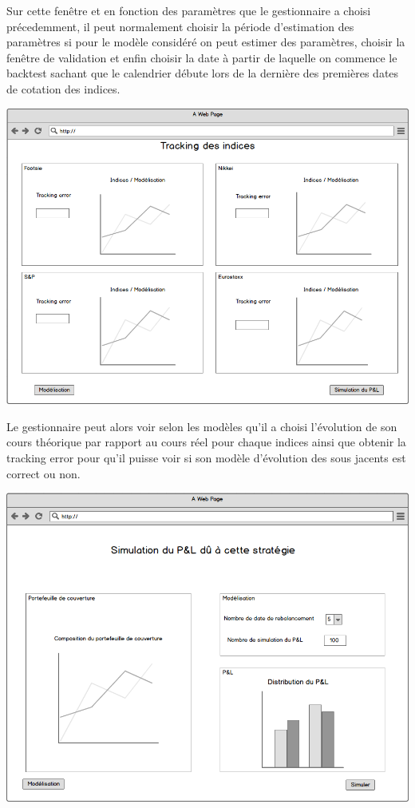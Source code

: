 \documentclass[french,12pt,a4paper]{article}
\begin{document}
 Sur cette fenêtre et en fonction des paramètres que le gestionnaire a choisi précedemment, il peut normalement choisir la période d'estimation des paramètres si pour le modèle considéré on peut estimer des paramètres, choisir la fenêtre de validation et enfin choisir la date à partir de laquelle on commence le backtest sachant que le calendrier débute lors de la dernière des premières dates de cotation des indices.

\begin{center}
\includegraphics[scale=0.4]{../Images/Maquette_8.png}
\end{center}

Le gestionnaire peut alors voir selon les modèles qu'il a choisi l'évolution de son cours théorique par rapport au cours réel pour chaque indices ainsi que obtenir la tracking error pour qu'il puisse voir si son modèle d'évolution des sous jacents est correct ou non.

\begin{center}
\includegraphics[scale=0.4]{../Images/Maquette_5.png}
\end{center}
\end{document}
